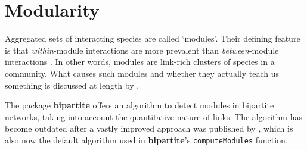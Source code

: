 \documentclass[a4paper, 11pt]{article}\usepackage[]{graphicx}\usepackage[]{color}
\newcommand{\package}[1]{\textbf{#1}}
\newcommand{\code}[1]{\texttt{#1}}
\begin{document}
\section{Modularity}
Aggregated sets of interacting species are called `modules'. Their defining feature is that \emph{within}-module interactions are more prevalent than \emph{between}-module interactions \citep{Newman2003,Newman2004,Fortunato2010}. In other words, modules are link-rich clusters of species in a community. What causes such modules and whether they actually teach us something is discussed at length by \citet{Dormann2017AREES}. 

The package \package{bipartite} offers an algorithm \citep[QuaBiMo, described in technical detail in][]{Dormann2014} to detect modules in bipartite networks, taking into account the quantitative nature of links. The algorithm has become outdated after a vastly improved approach was published by \citet{Beckett2016}, which is also now the default algorithm used in \package{bipartite}'s \code{computeModules} function.
\end{document}
